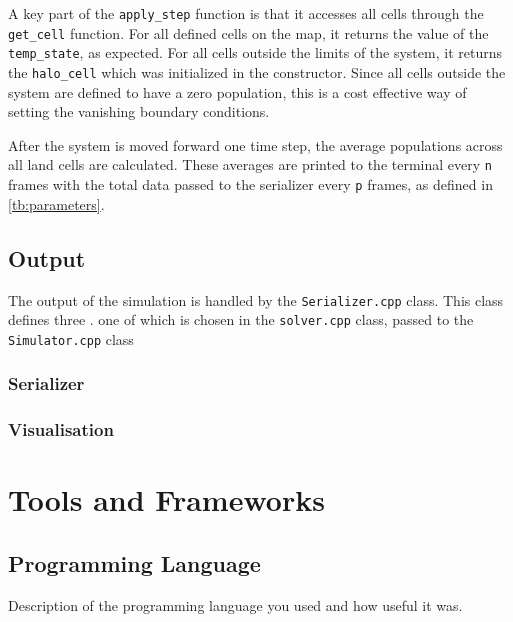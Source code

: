 \documentclass[a4paper,11pt]{article}
\begin{document}
A key part of the \texttt{apply\_step} function is that it accesses all cells through the \texttt{get\_cell} function.  For all defined cells on the map, it returns the value of the \texttt{temp\_state}, as expected.  For all cells outside the limits of the system, it returns the \texttt{halo\_cell} which was initialized in the constructor.  Since all cells outside the system are defined to have a zero population, this is a cost effective way of setting the vanishing boundary conditions.


After the system is moved forward one time step, the average populations across all land cells are calculated.  These averages are printed to the terminal every \texttt{n} frames with the total data passed to the serializer every \texttt{p} frames, as defined in \ref{tb:parameters}.

\subsection{Output}\label{output}

The output of the simulation is handled by the \texttt{Serializer.cpp} class.  This class defines three . one of which is chosen in the \texttt{solver.cpp} class, passed to the \texttt{Simulator.cpp} class

\subsubsection{Serializer}

\subsubsection{Visualisation}

\section{Tools and Frameworks}

\subsection{Programming Language}
Description of the programming language you used and how useful it was.
\end{document}
